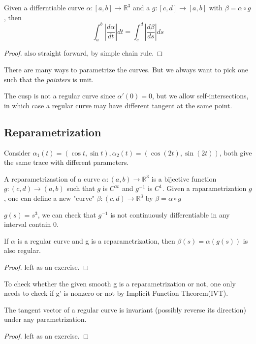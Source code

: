 \documentclass{article}
\begin{document}
\begin{proposition}
   Given a differntiable curve $\alpha:[a,b]\to \mathbb{R}^3$ and a $g:[c,d] \to [a,b] $ with $\beta=\alpha\circ g$, then \[\int_a^b |\frac{d\alpha}{dt}|dt=\int_c^d|\frac{d\beta}{ds}|ds\] 
\end{proposition}
\begin{proof}
    also straight forward, by simple chain rule.
\end{proof}
There are many ways to parametrize the curves. But we always want to pick one such that the \textit{pointers} is unit.
\begin{remark}
    The cusp is not a regular curve since $\alpha'(0)=0$, but we allow self-intersections, in which case a regular curve may have different tangent at the same point.    
\end{remark}

\subsection{Reparametrization}
Consider $\alpha_1(t)=(\cos t,\sin t), \alpha_2(t)=(\cos(2t),\sin(2t))$, both give the same trace with different parameters.
\begin{definition}
    A reparametrizastion of a curve $\alpha:(a,b)\to \mathbb{R}^3 $ is a bijective function $g:(c,d)\to (a,b)$ such that $g$ is $C^{\infty}$ and $g^{-1}$ is $C^1$. Given a raparametrization $g$, one can define a new "curve" $\beta:(c,d)\to \mathbb{R}^3$ by $\beta=\alpha\circ g$
\end{definition}

\begin{example}[nonexample]
    $g(s)=s^3$, we can check that $g^{-1}$ is not continuously differentiable in any interval contain 0.
\end{example}

\begin{proposition}
    If $\alpha $ is a regular curve and g is a reparametrization, then $\beta(s)=\alpha(g(s))$ is also regular.
\end{proposition}
\begin{proof}
    left as an exercise.
\end{proof}
\begin{remark}
    To check whether the given smooth g is a reparametrization or not, one only needs to check if g' is nonzero or not by Implicit Function Theorem(IVT).
\end{remark}
\begin{proposition}
    The tangent vector of a regular curve is invariant (possibly reverse its direction) under any parametrization.
\end{proposition}
\begin{proof}
    left as an exercise.
\end{proof}
\end{document}
